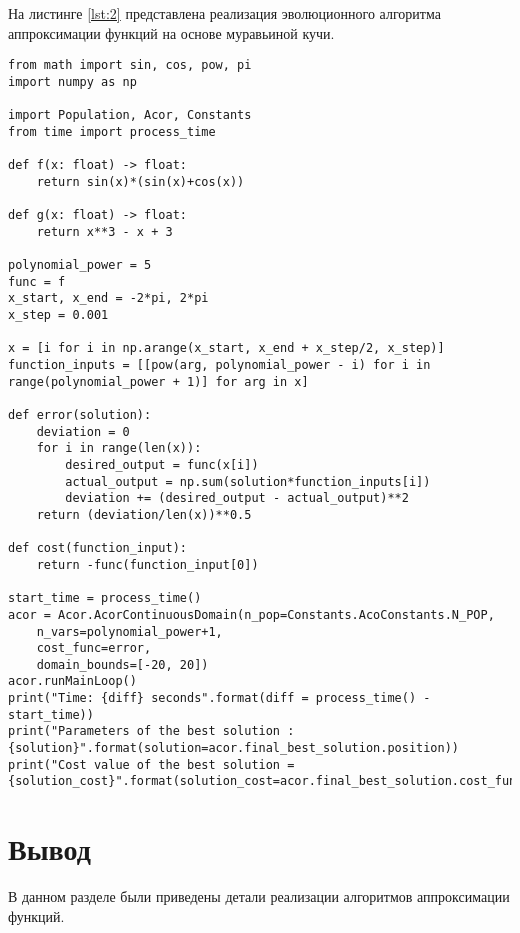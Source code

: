 На листинге \ref{lst:2} представлена реализация эволюционного алгоритма аппроксимации функций на основе муравьиной кучи.

\begin{lstlisting}[label=lst:2,caption=Эволюционный алгоритм аппроксимации функций]
from math import sin, cos, pow, pi
import numpy as np

import Population, Acor, Constants
from time import process_time

def f(x: float) -> float:
	return sin(x)*(sin(x)+cos(x))

def g(x: float) -> float:
	return x**3 - x + 3

polynomial_power = 5
func = f
x_start, x_end = -2*pi, 2*pi
x_step = 0.001

x = [i for i in np.arange(x_start, x_end + x_step/2, x_step)]
function_inputs = [[pow(arg, polynomial_power - i) for i in range(polynomial_power + 1)] for arg in x]

def error(solution):
	deviation = 0
	for i in range(len(x)):
		desired_output = func(x[i])
		actual_output = np.sum(solution*function_inputs[i])
		deviation += (desired_output - actual_output)**2
	return (deviation/len(x))**0.5

def cost(function_input):
	return -func(function_input[0])

start_time = process_time()
acor = Acor.AcorContinuousDomain(n_pop=Constants.AcoConstants.N_POP, 
	n_vars=polynomial_power+1,
	cost_func=error,
	domain_bounds=[-20, 20])
acor.runMainLoop()
print("Time: {diff} seconds".format(diff = process_time() - start_time))
print("Parameters of the best solution : {solution}".format(solution=acor.final_best_solution.position))
print("Cost value of the best solution = {solution_cost}".format(solution_cost=acor.final_best_solution.cost_function))
\end{lstlisting}


\section*{Вывод}

В данном разделе были приведены детали реализации алгоритмов аппроксимации функций.

\clearpage
